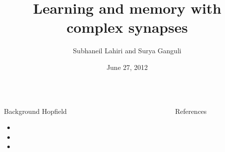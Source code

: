 \documentclass[final,hyperref={pdfpagelabels=false}]{beamer}
\title{Learning and memory with complex synapses}
\author{Subhaneil Lahiri and Surya Ganguli}
\institute[Stanford]{%
Department of Applied Physics, Stanford University, Stanford CA
}
\date[6/27/12]{June 27, 2012}%
\begin{document}
\begin{frame}{}

\begin{columns}[t]


\begin{column}{0.33\linewidth}


\begin{block}{Background}
%
 Hopfield
 \begin{itemize}
   \item
   \item
   \item
 \end{itemize}
%
\end{block}


\end{column}

\begin{column}{0.33\linewidth}

\end{column}

\begin{column}{0.33\linewidth}





\begin{block}{References}
%
 {\small
 
 
 }
%
\end{block}


\end{column}





\end{columns}

\end{frame}
\end{document}
